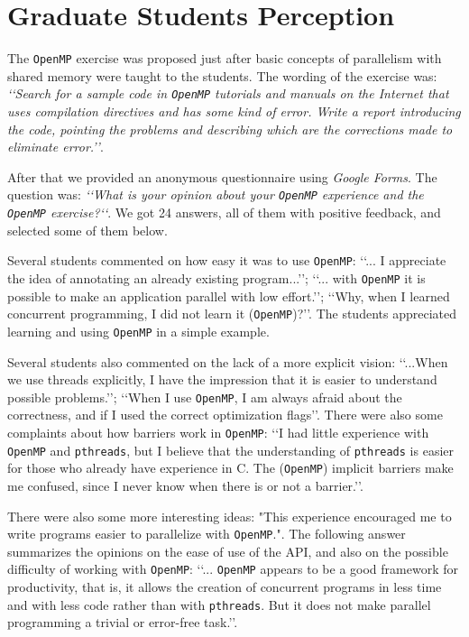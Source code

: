 \section{Graduate Students Perception}
\label{sec:students:perception}

The \texttt{OpenMP} exercise was proposed just after basic concepts of parallelism with shared memory were taught to the students.
The wording of the exercise was: \emph{\lq\lq{}Search for a sample code in \texttt{OpenMP} tutorials and manuals on the Internet that uses compilation directives and has some kind of error. Write a report introducing the code, pointing the problems and describing which are the corrections made to eliminate error.\rq\rq{}}.

After that we provided an anonymous questionnaire using \emph{Google Forms}. The question was: \emph{\lq\lq{}What is your opinion about your \texttt{OpenMP} experience and the \texttt{OpenMP} exercise?\lq\lq{}}. We got 24 answers, all of them with positive feedback, and selected some of them below.

Several students commented on how easy it was to use \texttt{OpenMP}: \lq\lq{}... I appreciate the idea of annotating an already existing program...\rq\rq{}; \lq\lq{}... with \texttt{OpenMP} it is possible to make an application parallel with low effort.\rq\rq{}; \lq\lq{}Why, when I learned concurrent programming, I did not learn it (\texttt{OpenMP})?\rq\rq{}. The students appreciated learning and using \texttt{OpenMP} in a simple example.

Several students also commented on the lack of a more explicit vision: \lq\lq.{}..When we use threads explicitly, I have the impression that it is easier to understand possible problems.\rq\rq{}; \lq\lq{}When I use \texttt{OpenMP}, I am always afraid about the correctness, and if I used the correct optimization flags\rq\rq{}. There were also some complaints about how barriers work in \texttt{OpenMP}: \lq\lq{}I had little experience with \texttt{OpenMP} and \texttt{pthreads}, but I believe that the understanding of \texttt{pthreads} is easier for those who already have experience in C. The (\texttt{OpenMP}) implicit barriers make me confused, since I never know when there is or not a barrier.\rq\rq{}.

There were also some more interesting ideas: "This experience encouraged me to write programs easier to parallelize with \texttt{OpenMP}.".
The following answer summarizes the opinions on the ease of use of the API, and also on the possible difficulty of working with \texttt{OpenMP}: \lq\lq{}... \texttt{OpenMP} appears to be a good framework for productivity, that is, it allows the creation of concurrent programs in less time and with less code rather than with \texttt{pthreads}. But it does not make parallel programming a trivial or error-free task.\rq\rq{}.


